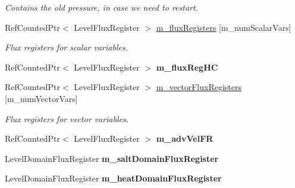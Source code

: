 \begin{DoxyCompactItemize}
\begin{DoxyCompactList}\small\item\em Contains the old pressure, in case we need to restart. \end{DoxyCompactList}\item 
\hypertarget{class_a_m_r_level_mushy_layer_a415e82d9a6e78b645eef60b573aec79e}{Ref\-Counted\-Ptr$<$ Level\-Flux\-Register $>$ \hyperlink{class_a_m_r_level_mushy_layer_a415e82d9a6e78b645eef60b573aec79e}{m\-\_\-flux\-Registers} \mbox{[}m\-\_\-num\-Scalar\-Vars\mbox{]}}\label{class_a_m_r_level_mushy_layer_a415e82d9a6e78b645eef60b573aec79e}

\begin{DoxyCompactList}\small\item\em Flux registers for scalar variables. \end{DoxyCompactList}\item 
\hypertarget{class_a_m_r_level_mushy_layer_aeaa3fd2d4ab926288073064170e791f3}{Ref\-Counted\-Ptr$<$ Level\-Flux\-Register $>$ {\bfseries m\-\_\-flux\-Reg\-H\-C}}\label{class_a_m_r_level_mushy_layer_aeaa3fd2d4ab926288073064170e791f3}

\item 
\hypertarget{class_a_m_r_level_mushy_layer_ab6d6bc6e97ec3b0bdfe4a13de762f48c}{Ref\-Counted\-Ptr$<$ Level\-Flux\-Register $>$ \hyperlink{class_a_m_r_level_mushy_layer_ab6d6bc6e97ec3b0bdfe4a13de762f48c}{m\-\_\-vector\-Flux\-Registers} \mbox{[}m\-\_\-num\-Vector\-Vars\mbox{]}}\label{class_a_m_r_level_mushy_layer_ab6d6bc6e97ec3b0bdfe4a13de762f48c}

\begin{DoxyCompactList}\small\item\em Flux registers for vector variables. \end{DoxyCompactList}\item 
\hypertarget{class_a_m_r_level_mushy_layer_a9086ff974a6766f02f3ecf0d25e98a08}{Ref\-Counted\-Ptr$<$ Level\-Flux\-Register $>$ {\bfseries m\-\_\-adv\-Vel\-F\-R}}\label{class_a_m_r_level_mushy_layer_a9086ff974a6766f02f3ecf0d25e98a08}

\item 
\hypertarget{class_a_m_r_level_mushy_layer_a7f0dd62b216d0ab459d2f8469297c852}{Level\-Domain\-Flux\-Register {\bfseries m\-\_\-salt\-Domain\-Flux\-Register}}\label{class_a_m_r_level_mushy_layer_a7f0dd62b216d0ab459d2f8469297c852}

\item 
\hypertarget{class_a_m_r_level_mushy_layer_a12005aabbc909314eba74afaba3a9188}{Level\-Domain\-Flux\-Register {\bfseries m\-\_\-heat\-Domain\-Flux\-Register}}\label{class_a_m_r_level_mushy_layer_a12005aabbc909314eba74afaba3a9188}


\end{DoxyCompactItemize}
